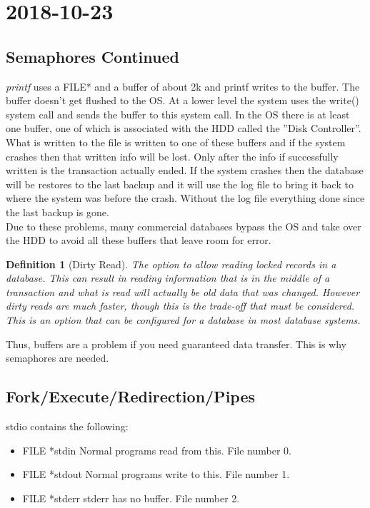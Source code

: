 \documentclass{report}
\newtheorem*{defn}{Definition}
\newcommand{\mychapter}[2]{
	\setcounter{chapter}{#1}
	\setcounter{section}{0}
	\chapter*{#2}
	\addcontentsline{toc}{chapter}{#2}
}
\begin{document}
\mychapter{5}{2018-10-23}
\section*{Semaphores Continued}
\textit{printf} uses a FILE* and a buffer of about 2k and printf writes to the buffer. The buffer doesn't get flushed to the OS. At a lower level the system uses the write() system call and sends the buffer to this system call. In the OS there is at least one buffer, one of which is associated with the HDD called the ''Disk Controller''. What is written to the file is written to one of these buffers and if the system crashes then that written info will be lost. Only after the info if successfully written is the transaction actually ended. If the system crashes then the database will be restores to the last backup and it will use the log file to bring it back to where the system was before the crash. Without the log file everything done since the last backup is gone.\\

Due to these problems, many commercial databases bypass the OS and take over the HDD to avoid all these buffers that leave room for error.\\ 

\begin{defn}[Dirty Read]
The option to allow reading locked records in a database. This can result in reading information that is in the middle of a transaction and what is read will actually be old data that was changed. However dirty reads are much faster, though this is the trade-off that must be considered. This is an option that can be configured for a database in most database systems.
\end{defn}

Thus, buffers are a problem if you need guaranteed data transfer. This is why semaphores are needed.

\section*{Fork/Execute/Redirection/Pipes}
stdio contains the following:
\begin{itemize}
\item FILE *stdin
	Normal programs read from this. File number 0.
\item FILE *stdout
	Normal programs write to this. File number 1.
\item FILE *stderr
	stderr has no buffer. File number 2.
\end{itemize}
\end{document}
